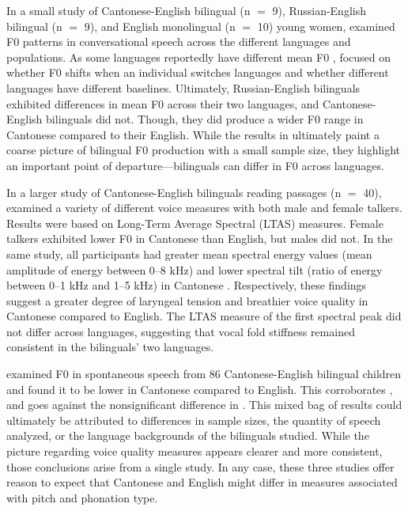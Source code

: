 In a small study of Cantonese-English bilingual (n $=$ 9), Russian-English bilingual (n $=$ 9), and English monolingual (n $=$ 10) young women, \citet{altenberg_2006_f0} examined F0 patterns in conversational speech across the different languages and populations. As some languages reportedly have different mean F0 \citep[e.g.,][]{keating_2012_f0}, \citet{altenberg_2006_f0} focused on whether F0 shifts when an individual switches languages and whether different languages have different baselines. Ultimately, Russian-English bilinguals exhibited differences in mean F0 across their two languages, and Cantonese-English bilinguals did not. Though, they did produce a wider F0 range in Cantonese compared to their English. While the results in \citet{altenberg_2006_f0} ultimately paint a coarse picture of bilingual F0 production with a small sample size, they highlight an important point of departure---bilinguals can differ in F0 across languages. 

In a larger study of Cantonese-English bilinguals reading passages (n $=$ 40), \citet{ng_2012_ltas} examined a variety of different voice measures with both male and female talkers. Results were based on Long-Term Average Spectral (LTAS) measures. Female talkers exhibited lower F0 in Cantonese than English, but males did not. In the same study, all participants had greater mean spectral energy values (mean amplitude of energy between 0--8 kHz) and lower spectral tilt (ratio of energy between 0--1 kHz and 1--5 kHz) in Cantonese \citep{ng_2012_ltas}. Respectively, these findings suggest a greater degree of laryngeal tension and breathier voice quality in Cantonese compared to English. The LTAS measure of the first spectral peak did not differ across languages, suggesting that vocal fold stiffness remained consistent in the bilinguals' two languages. 

\citet{ng_2010_voice} examined F0 in spontaneous speech from 86 Cantonese-English bilingual children and found it to be lower in Cantonese compared to English. This corroborates \citet{ng_2012_ltas}, and goes against the nonsignificant difference in \citet{altenberg_2006_f0}. This mixed bag of results could ultimately be attributed to differences in sample sizes, the quantity of speech analyzed, or the language backgrounds of the bilinguals studied. While the picture regarding voice quality measures appears clearer and more consistent, those conclusions arise from a single study. In any case, these three studies offer reason to expect that Cantonese and English might differ in measures associated with pitch and phonation type. 

